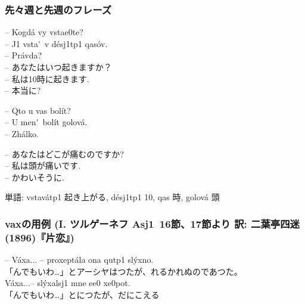 \documentclass[a4j,11pt]{jsarticle}
\begin{document}
\subsubsection*{先々週と先週のフレーズ}
\begin{multicolpar}{2}
\--- Kogd\'a vy vsta{e0}te?\\
\--- {J1} vsta\'\cyryu\ v d\'es{j1}t{p1} qas\'ov.\\
\--- Pr\'avda?\\

\noindent
\--- あなたはいつ起きますか？\\
\--- 私は10時に起きます.\\
\--- 本当に?\\
\end{multicolpar}
\begin{multicolpar}{2}
\--- Qto u vas bol\'it?\\
\--- U men\'\cyrya\ bol\'it golov\'a.\\
\--- {Zh}\'alko.

\noindent
\--- あなたはどこが痛むのですか?\\
\--- 私は頭が痛いです.\\
\--- かわいそうに.
\end{multicolpar}
単語: vstav\'at{p1} 起き上がる, d\'es{j1}t{p1} 10, qas 時, golov\'a 頭
\subsubsection*{vaxの用例 (I. ツルゲーネフ \guillemotleft As{j1}\guillemotright\ 16節、17節より 訳: 二葉亭四迷(1896)『片恋』)}
\noindent
\--- V\'axa... \--- proxept\'ala ona qut{p1} sl\'yxno.\\
「んでもいわ…」とアーシヤはつたが、れるかれぬのであつた。\\
\flqq{}V\'axa...\frqq \--- sl\'yxals{j1} mne e{e0} x{e0}pot.\\
「んでもいわ…」とにつたが、だにこえる
\end{document}
